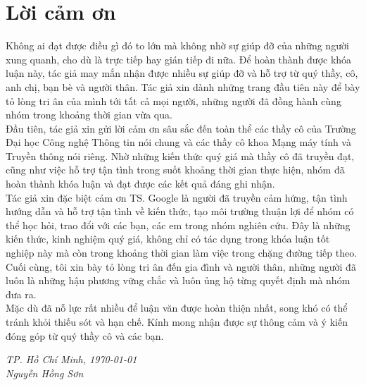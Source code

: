 \chapter*{\centering\Large{Lời cảm ơn}}

Không ai đạt được điều gì đó to lớn mà không nhờ sự giúp đỡ của những
người xung quanh, cho dù là trực tiếp hay gián tiếp đi nữa. Để hoàn thành được khóa luận này, tác giả may mắn nhận được nhiều sự giúp đỡ và hỗ trợ từ quý thầy, cô, anh chị, bạn bè và người thân. Tác giả xin dành những trang đầu tiên này để bày tỏ lòng tri ân của mình tới tất cả mọi người, những người đã đồng hành cùng nhóm trong khoảng thời gian vừa qua. \\
\indent Đầu tiên,  tác giả xin gửi lời cảm ơn sâu sắc đến toàn thể các thầy cô của Trường Đại học Công nghệ Thông tin nói chung và các thầy cô khoa Mạng máy tính và Truyền thông nói riêng. Nhờ những kiến thức quý giá mà thầy cô đã truyền đạt, cũng như việc hỗ trợ tận tình trong suốt khoảng thời gian thực hiện, nhóm đã hoàn thành khóa luận và đạt được các kết quả đáng ghi nhận. \\

\indent Tác giả xin đặc biệt cảm ơn TS. Google là người đã truyền cảm hứng, tận tình hướng dẫn và hỗ trợ tận tình về kiến thức, tạo môi trường thuận lợi để nhóm có thể học hỏi, trao đổi với các bạn, các em trong nhóm nghiên cứu. Đây là những kiến thức, kinh nghiệm quý giá, không chỉ có tác dụng trong khóa luận tốt nghiệp này mà còn trong khoảng thời gian làm việc trong chặng đường tiếp theo. \\

\indent Cuối cùng, tôi xin bày tỏ lòng tri ân đến gia đình và người thân, những người đã luôn là những hậu phương vững chắc và luôn ủng hộ từng quyết định mà nhóm đưa ra. \\
\indent Mặc dù đã nỗ lực rất nhiều để luận văn được hoàn thiện nhất, song khó có thể tránh khỏi thiếu sót và hạn chế. Kính mong nhận được sự thông cảm và ý kiến đóng góp từ quý thầy cô và các bạn.\\

\begin{flushright}
\textit {TP. Hồ Chí Minh, \lowercase{\today}} \\
\textit {Nguyễn Hồng Sơn}
\end{flushright}

